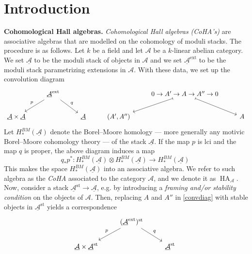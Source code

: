 \documentclass[11pt]{article}
\begin{document}
\section{Introduction}
\noindent\textbf{Cohomological Hall algebras. }\textit{Cohomological Hall algebras (\textit{CoHA}'s)} are associative algebras that are modelled on the cohomology of moduli stacks. The procedure is as follows. Let $k$ be a field and let $\mathcal{A}$ be a $k$-linear abelian category. We set $\underline{\mathcal{A}}$ to be the moduli stack of objects in ${\mathcal{A}}$ and we set $\underline{\mathcal{A}}^{\operatorname{ext}}$ to be the moduli stack parametrizing extensions in $\mathcal{A}$. With these data, we set up the convolution diagram
\begin{equation}\label{convdiag}
   \begin{tikzcd}
	& {\underline{\mathcal{A}}^{\operatorname{ext}} } &&& {0 \rightarrow A' \rightarrow A \rightarrow A'' \rightarrow 0} & \\
	{\underline{\mathcal{A}} \times \underline{\mathcal{A}}} && {\underline{\mathcal{A}}} & {(A', A'')} && A
	\arrow["{p}"', from=1-2, to=2-1]
	\arrow["{q}", from=1-2, to=2-3]
	\arrow[maps to, from=1-5, to=2-4]
	\arrow[maps to, from=1-5, to=2-6]
\end{tikzcd}
    \end{equation}
Let $H^{BM}_*(\underline{\mathcal{A}})$ denote the Borel--Moore homology --- more generally any motivic Borel--Moore cohomology theory --- of the stack $\underline{\mathcal{A}}$. If the map $p$ is lci and the map $q$ is proper, the above diagram induces a map
\begin{equation}\label{product}
    q_*p^* \colon H^{BM}_*(\underline{\mathcal{A}})\otimes H^{BM}_*(\underline{\mathcal{A}}) \longrightarrow H^{BM}_*(\underline{\mathcal{A}}) \ 
\end{equation}
This makes the space $H^{BM}_*(\underline{\mathcal{A}})$ into an associative algebra. We refer to such algebra as the \textit{CoHA} associated to the category $\mathcal{A}$, and we denote it as $\operatorname{HA}_{\mathcal{A}}$. Now, consider a stack $\underline{\mathcal{A}}^{\operatorname{st}} \rightarrow \underline{\mathcal{A}}$, e.g. by introducing a \textit{framing and/or stability condition} on the objects of $\mathcal{A}$. Then, replacing $A$ and $A''$ in \eqref{convdiag} with stable objects in $\underline{\mathcal{A}}^{\operatorname{st}}$ yields a correspondence
\begin{equation}\label{action}
    \begin{tikzcd}
        &  (\underline{\mathcal{A}}^{\operatorname{ext}})^{\operatorname{st}} \arrow[dl, "{p}"'] \arrow[dr, "{q}"] & \\
 \underline{\mathcal{A}} \times \underline{\mathcal{A}}^{\operatorname{st}} && \underline{\mathcal{A}}^{\operatorname{st}} \ 
    \end{tikzcd}
    \end{equation}
\end{document}
